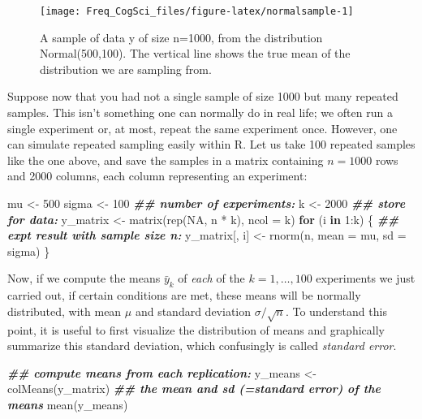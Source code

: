 \documentclass[
  12pt,
]{krantz}
\newenvironment{Shaded}{\begin{snugshade}}{\end{snugshade}}
\newcommand{\AttributeTok}[1]{\textcolor[rgb]{0.77,0.63,0.00}{#1}}
\newcommand{\ConstantTok}[1]{\textcolor[rgb]{0.00,0.00,0.00}{#1}}
\newcommand{\ControlFlowTok}[1]{\textcolor[rgb]{0.13,0.29,0.53}{\textbf{#1}}}
\newcommand{\DecValTok}[1]{\textcolor[rgb]{0.00,0.00,0.81}{#1}}
\newcommand{\DocumentationTok}[1]{\textcolor[rgb]{0.56,0.35,0.01}{\textbf{\textit{#1}}}}
\newcommand{\FunctionTok}[1]{\textcolor[rgb]{0.00,0.00,0.00}{#1}}
\newcommand{\NormalTok}[1]{#1}
\newcommand{\OtherTok}[1]{\textcolor[rgb]{0.56,0.35,0.01}{#1}}
\newcommand{\SpecialCharTok}[1]{\textcolor[rgb]{0.00,0.00,0.00}{#1}}
\theoremstyle{definition}
\theoremstyle{definition}
\theoremstyle{definition}
\theoremstyle{definition}
\theoremstyle{remark}
\begin{document}
\begin{figure}
\texttt{[image: Freq\_CogSci\_files/figure-latex/normalsample-1]} \caption{A sample of data y of size n=1000, from the distribution Normal(500,100). The vertical line shows the true mean of the distribution we are sampling from.}\label{fig:normalsample}
\end{figure}

Suppose now that you had not a single sample of size 1000 but many repeated samples. This isn't something one can normally do in real life; we often run a single experiment or, at most, repeat the same experiment once. However, one can simulate repeated sampling easily within R. Let us take 100 repeated samples like the one above, and save the samples in a matrix containing \(n=1000\) rows and 2000 columns, each column representing an experiment:

\begin{Shaded}
\begin{Highlighting}[]
\NormalTok{mu }\OtherTok{\textless{}{-}} \DecValTok{500}
\NormalTok{sigma }\OtherTok{\textless{}{-}} \DecValTok{100}
\DocumentationTok{\#\# number of experiments:}
\NormalTok{k }\OtherTok{\textless{}{-}} \DecValTok{2000}
\DocumentationTok{\#\# store for data:}
\NormalTok{y\_matrix }\OtherTok{\textless{}{-}} \FunctionTok{matrix}\NormalTok{(}\FunctionTok{rep}\NormalTok{(}\ConstantTok{NA}\NormalTok{, n }\SpecialCharTok{*}\NormalTok{ k), }\AttributeTok{ncol =}\NormalTok{ k)}
\ControlFlowTok{for}\NormalTok{ (i }\ControlFlowTok{in} \DecValTok{1}\SpecialCharTok{:}\NormalTok{k) \{}
  \DocumentationTok{\#\# expt result with sample size n:}
\NormalTok{  y\_matrix[, i] }\OtherTok{\textless{}{-}} \FunctionTok{rnorm}\NormalTok{(n, }\AttributeTok{mean =}\NormalTok{ mu, }\AttributeTok{sd =}\NormalTok{ sigma)}
\NormalTok{\}}
\end{Highlighting}
\end{Shaded}

Now, if we compute the means \(\bar{y}_k\) of \emph{each} of the \(k=1,\dots,100\) experiments we just carried out, if certain conditions are met, these means will be normally distributed, with mean \(\mu\) and standard deviation \(\sigma/\sqrt{n}\). To understand this point, it is useful to first visualize the distribution of means and graphically summarize this standard deviation, which confusingly is called \emph{standard error}.

\begin{Shaded}
\begin{Highlighting}[]
\DocumentationTok{\#\# compute means from each replication:}
\NormalTok{y\_means }\OtherTok{\textless{}{-}} \FunctionTok{colMeans}\NormalTok{(y\_matrix)}
\DocumentationTok{\#\# the mean and sd (=standard error) of the means}
\FunctionTok{mean}\NormalTok{(y\_means)}
\end{Highlighting}
\end{Shaded}
\end{document}
